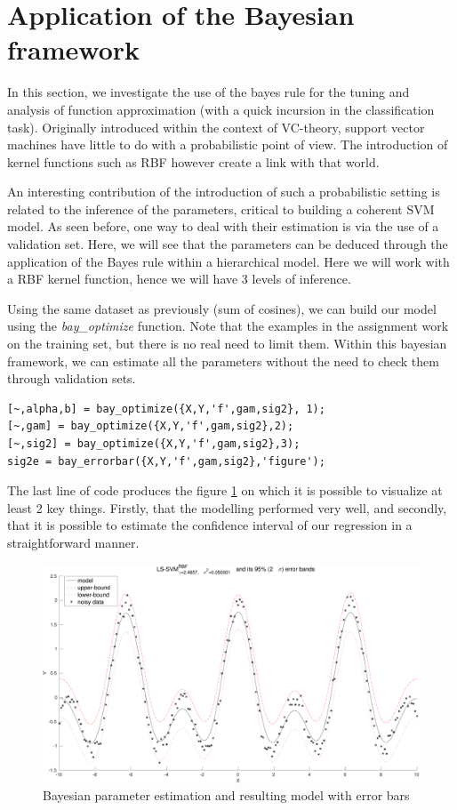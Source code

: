 \documentclass[11pt, a4paper]{article}
\begin{document}
\section{Application of the Bayesian framework}

In this section, we investigate the use of the bayes rule for the
tuning and analysis of function approximation (with a quick incursion
in the classification task). Originally introduced within the context
of VC-theory, support vector machines have little to do with a
probabilistic point of view. The introduction of kernel functions such
as RBF however create a link with that world.

An interesting contribution of the introduction of such a
probabilistic setting is related to the inference of the parameters,
critical to building a coherent SVM model. As seen before, one way to
deal with their estimation is via the use of a validation set. Here,
we will see that the parameters can be deduced through the application
of the Bayes rule within a hierarchical model. Here we will work with
a RBF kernel function, hence we will have 3 levels of inference.

Using the same dataset as previously (sum of cosines), we can build
our model using the \emph{bay\_optimize} function. Note that the
examples in the assignment work on the training set, but there is no
real need to limit them. Within this bayesian framework, we can
estimate all the parameters without the need to check them through
validation sets. 

\begin{lstlisting}
[~,alpha,b] = bay_optimize({X,Y,'f',gam,sig2}, 1);
[~,gam] = bay_optimize({X,Y,'f',gam,sig2},2);
[~,sig2] = bay_optimize({X,Y,'f',gam,sig2},3);
sig2e = bay_errorbar({X,Y,'f',gam,sig2},'figure');
\end{lstlisting}

The last line of code produces the figure \ref{fig:sumcos_bay1} on
which it is possible to visualize at least 2 key things. Firstly, that
the modelling performed very well, and secondly, that it is possible
to estimate the confidence interval of our regression in a
straightforward manner.

\begin{figure}[H]
    \centering
    \includegraphics[scale=.40]{sumcos_bay1.pdf}
    \caption{Bayesian parameter estimation and resulting model with error bars}
    \label{fig:sumcos_bay1}
\end{figure}
\end{document}
